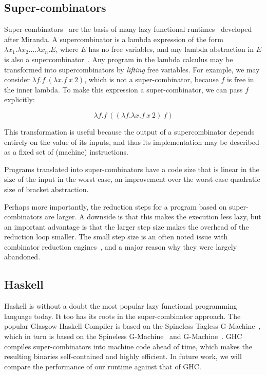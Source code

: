 \documentclass[conference]{IEEEtran}
\begin{document}
\subsection{Super-combinators}
Super-combinators~\cite{hughes_super-combinators_1982} are the basis of many lazy functional runtimes~\cite{fairbairn_tim_1987,kieburtz_g-machine_1985,burn_spineless_1988,jones_implementing_nodate} developed after Miranda.
A supercombinator is a lambda expression of the form $\lambda x_1. \lambda x_2. ... \lambda x_n. E$, where $E$ has no free variables, and any lambda abstraction in $E$ is also a supercombinator~\cite{spj_impl}.
Any program in the lambda calculus may be transformed into supercombinators by \emph{lifting} free variables.
For example, we may consider $\lambda f.f\ (\lambda x.f\ x\ 2)$, which is not a super-combinator, because $f$ is free in the inner lambda.
To make this expression a super-combinator, we can pass $f$ explicitly:

\[
    \lambda f. f\ ((\lambda f.\lambda x. f\ x\ 2)\ f)
\]

This transformation is useful because the output of a supercombinator depends entirely on the value of its inputs, and thus its implementation may be described as a fixed set of (machine) instructions.

Programs translated into super-combinators have a code size that is linear in the size of the input in the worst case, an improvement over the worst-case quadratic size of bracket abstraction.

Perhaps more importantly, the reduction steps for a program based on super-combinators are larger.
A downside is that this makes the execution less lazy, but an important advantage is that the larger step size makes the overhead of the reduction loop smaller.
The small step size is an often noted issue with combinator reduction engines~\cite{spj_impl}, and a major reason why they were largely abandoned.

\subsection{Haskell}
Haskell is without a doubt the most popular lazy functional programming language today.
It too has its roots in the super-combinator approach.
The popular Glasgow Haskell Compiler is based on the Spineless Tagless G-Machine~\cite{jones_implementing_nodate}, which in turn is based on the Spineless G-Machine~\cite{burn_spineless_1988} and G-Machine~\cite{kieburtz_g-machine_1985}.
GHC compiles super-combinators into machine code ahead of time, which makes the resulting binaries self-contained and highly efficient.
In future work, we will compare the performance of our runtime against that of GHC.
\end{document}
